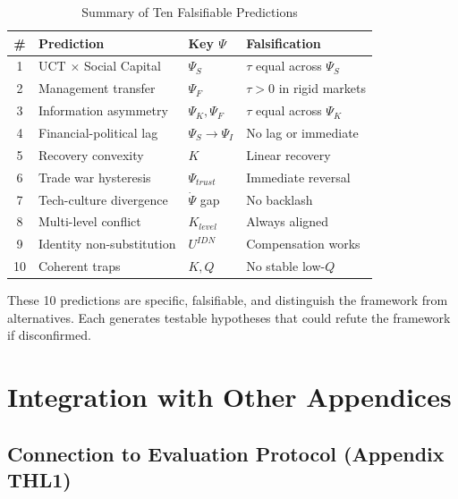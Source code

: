 \begin{table}[htbp]
\centering
\caption{Summary of Ten Falsifiable Predictions}
\label{tab:S-predictions}
\renewcommand{\arraystretch}{1.2}
\begin{tabular}{@{}clll@{}}
\toprule
\textbf{\#} & \textbf{Prediction} & \textbf{Key $\Psi$} & \textbf{Falsification} \\
\midrule
1 & UCT $\times$ Social Capital & $\Psi_S$ & $\tau$ equal across $\Psi_S$ \\
2 & Management transfer & $\Psi_F$ & $\tau > 0$ in rigid markets \\
3 & Information asymmetry & $\Psi_K, \Psi_F$ & $\tau$ equal across $\Psi_K$ \\
4 & Financial-political lag & $\Psi_S \to \Psi_I$ & No lag or immediate \\
5 & Recovery convexity & $K$ & Linear recovery \\
6 & Trade war hysteresis & $\Psi_{trust}$ & Immediate reversal \\
7 & Tech-culture divergence & $\dot{\Psi}$ gap & No backlash \\
8 & Multi-level conflict & $K_{level}$ & Always aligned \\
9 & Identity non-substitution & $U^{IDN}$ & Compensation works \\
10 & Coherent traps & $K, Q$ & No stable low-$Q$ \\
\bottomrule
\end{tabular}
\end{table}

These 10 predictions are specific, falsifiable, and distinguish the framework from alternatives. Each generates testable hypotheses that could refute the framework if disconfirmed.


\section{Integration with Other Appendices}
\label{sec:S-integration}

\subsection{Connection to Evaluation Protocol (Appendix THL1)}

